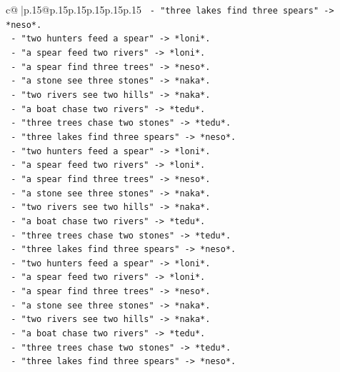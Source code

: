 \documentclass{article}
\begin{document}
{\begin{supertabular}{c@{$\;$}|p{.15\linewidth}@{}p{.15\linewidth}p{.15\linewidth}p{.15\linewidth}p{.15\linewidth}p{.15\linewidth}}
{{{\texttt{           {-} "three lakes find three spears" {-}> *neso*.} \\
\texttt{           {-} "two hunters feed a spear" {-}> *loni*.} \\
\texttt{           {-} "a spear feed two rivers" {-}> *loni*.} \\
\texttt{           {-} "a spear find three trees" {-}> *neso*.} \\
\texttt{           {-} "a stone see three stones" {-}> *naka*.} \\
\texttt{           {-} "two rivers see two hills" {-}> *naka*.} \\
\texttt{           {-} "a boat chase two rivers" {-}> *tedu*.} \\
\texttt{           {-} "three trees chase two stones" {-}> *tedu*.} \\
\texttt{           {-} "three lakes find three spears" {-}> *neso*.} \\
\texttt{           {-} "two hunters feed a spear" {-}> *loni*.} \\
\texttt{           {-} "a spear feed two rivers" {-}> *loni*.} \\
\texttt{           {-} "a spear find three trees" {-}> *neso*.} \\
\texttt{           {-} "a stone see three stones" {-}> *naka*.} \\
\texttt{           {-} "two rivers see two hills" {-}> *naka*.} \\
\texttt{           {-} "a boat chase two rivers" {-}> *tedu*.} \\
\texttt{           {-} "three trees chase two stones" {-}> *tedu*.} \\
\texttt{           {-} "three lakes find three spears" {-}> *neso*.} \\
\texttt{           {-} "two hunters feed a spear" {-}> *loni*.} \\
\texttt{           {-} "a spear feed two rivers" {-}> *loni*.} \\
\texttt{           {-} "a spear find three trees" {-}> *neso*.} \\
\texttt{           {-} "a stone see three stones" {-}> *naka*.} \\
\texttt{           {-} "two rivers see two hills" {-}> *naka*.} \\
\texttt{           {-} "a boat chase two rivers" {-}> *tedu*.} \\
\texttt{           {-} "three trees chase two stones" {-}> *tedu*.} \\
\texttt{           {-} "three lakes find three spears" {-}> *neso*.} \\
}}}
\end{supertabular}}
\end{document}
